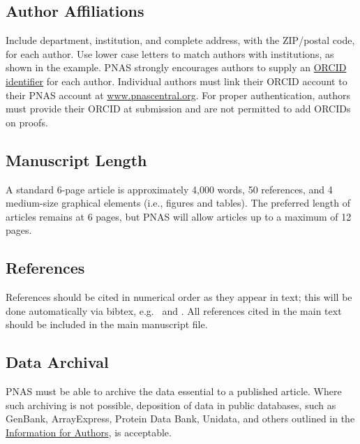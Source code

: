 \documentclass[
  9pt,
  twocolumn,
  twoside]{pnas-new}
\begin{document}
\subsection*{Author Affiliations}\label{author-affiliations}

Include department, institution, and complete address, with the
ZIP/postal code, for each author. Use lower case letters to match
authors with institutions, as shown in the example. PNAS strongly
encourages authors to supply an \href{https://orcid.org/}{ORCID
identifier} for each author. Individual authors must link their ORCID
account to their PNAS account at
\href{http://www.pnascentral.org/}{www.pnascentral.org}. For proper
authentication, authors must provide their ORCID at submission and are
not permitted to add ORCIDs on proofs.

\subsection*{Manuscript Length}\label{manuscript-length}

A standard 6-page article is approximately 4,000 words, 50 references,
and 4 medium-size graphical elements (i.e., figures and tables). The
preferred length of articles remains at 6 pages, but PNAS will allow
articles up to a maximum of 12 pages.

\subsection*{References}\label{references}

References should be cited in numerical order as they appear in text;
this will be done automatically via bibtex, e.g.~\cite{belkin2002using}
and
\cite{berard1994embedding,coifman2005geometric,phdthesis,masterthesis}.
All references cited in the main text should be included in the main
manuscript file.

\subsection*{Data Archival}\label{data-archival}

PNAS must be able to archive the data essential to a published article.
Where such archiving is not possible, deposition of data in public
databases, such as GenBank, ArrayExpress, Protein Data Bank, Unidata,
and others outlined in the
\href{https://www.pnas.org/author-center/editorial-and-journal-policies\#materials-and-data-availability}{Information
for Authors}, is acceptable.
\end{document}
